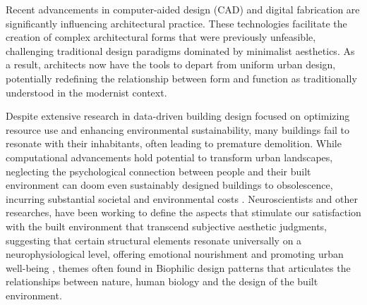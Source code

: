 


Recent advancements in computer-aided design (CAD) and digital fabrication are significantly influencing architectural practice.
These technologies facilitate the creation of complex architectural forms that were previously unfeasible, challenging traditional design paradigms dominated by minimalist aesthetics.
As a result, architects now have the tools to depart from uniform urban design, potentially redefining the relationship between form and function as traditionally understood in the modernist context\cite{Gage2015}.

Despite extensive research in data-driven building design focused on optimizing resource use and enhancing environmental sustainability, many buildings fail to resonate with their inhabitants, often leading to premature demolition.
While computational advancements hold potential to transform urban landscapes, neglecting the psychological connection between people and their built environment can doom even sustainably designed buildings to obsolescence, incurring substantial societal and environmental costs \cite{Aesthetic2022}.
Neuroscientists and other researches, have been working to define the aspects that stimulate our satisfaction with the built environment that transcend subjective aesthetic judgments, suggesting that certain structural elements resonate universally on a neurophysiological level, offering emotional nourishment and promoting urban well-being \cite{Brielmann2022}, themes often found in Biophilic design patterns that articulates the relationships between nature, human biology
and the design of the built environment.


